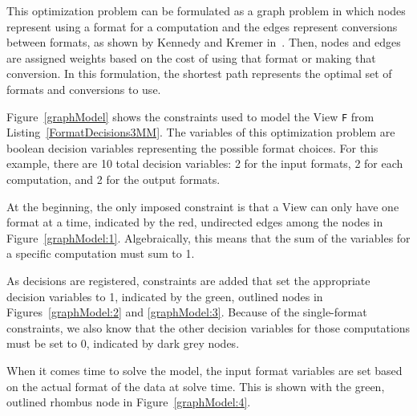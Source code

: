 This optimization problem can be formulated as a graph problem in which nodes represent using a format for a computation and the edges represent conversions between formats, as shown by Kennedy and Kremer in~\cite{kennedy1998automatic}.
Then, nodes and edges are assigned weights based on the cost of using that format or making that conversion. 
In this formulation, the shortest path represents the optimal set of formats and conversions to use.

Figure~\ref{graphModel} shows the constraints used to model the View \verb.F. from Listing~\ref{FormatDecisions3MM}.
The variables of this optimization problem are boolean decision variables representing the possible format choices. 
For this example, there are 10 total decision variables: 2 for the input formats, 2 for each computation, and 2 for the output formats.

At the beginning, the only imposed constraint is that a View can only have one format at a time, indicated by the red, undirected edges among the nodes in Figure~\ref{graphModel:1}.
Algebraically, this means that the sum of the variables for a specific computation must sum to 1. 

As decisions are registered, constraints are added that set the appropriate decision variables to 1, indicated by the green, outlined nodes in Figures~\ref{graphModel:2} and \ref{graphModel:3}. 
Because of the single-format constraints, we also know that the other decision variables for those computations must be set to 0, indicated by dark grey nodes.

When it comes time to solve the model, the input format variables are set based on the actual format of the data at solve time. This is shown with the green, outlined rhombus node in Figure~\ref{graphModel:4}.




